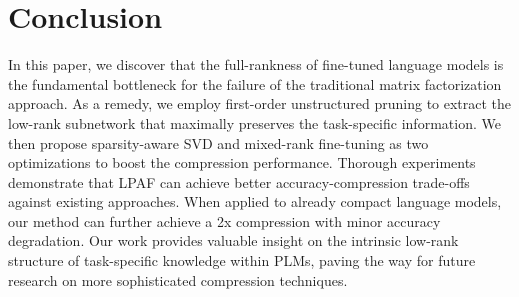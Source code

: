 \section{Conclusion}
In this paper, we discover that the full-rankness of fine-tuned language models is the fundamental bottleneck for the failure of the traditional matrix factorization approach. As a remedy, we employ first-order unstructured pruning to extract the low-rank subnetwork that maximally preserves the task-specific information. We then propose sparsity-aware SVD and mixed-rank fine-tuning as two optimizations to boost the compression performance. Thorough experiments demonstrate that LPAF can achieve better accuracy-compression trade-offs against existing approaches. 
When applied to already compact language models, our method can further achieve a 2x compression with minor accuracy degradation. Our work provides valuable insight on the intrinsic low-rank structure of task-specific knowledge within PLMs, paving the way for future research on more sophisticated compression techniques.